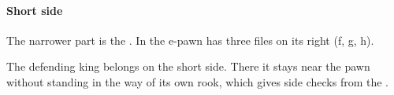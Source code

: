 \paragraph{Short side}\label{short-side}

The narrower part is the
.
In  the e-pawn has three files on its right (f, g, h).

The defending king belongs on the short side. There it stays near the pawn without standing in
the way of its own rook, which gives side checks from the .

